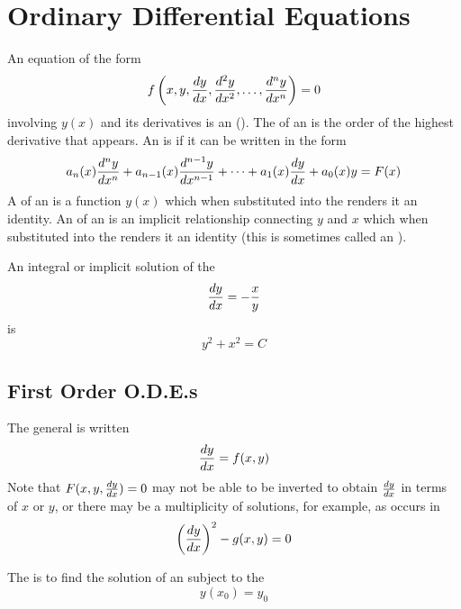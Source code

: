 %
%
%
%
%

\chapter{Ordinary Differential Equations}
\label{ode chp}

An equation of the form
$$f\left(x,y,\frac{dy}{dx},\frac{d^2y}{d{x}^2},\ldots,\frac{d^{n}y}{d{x}^{n}}\right)=0$$
involving $y(x)$ and its derivatives is an  (\ODE).  The  of an \ODE is the order of the
highest derivative that appears.  An \ODE is  if it can be
written in the form
$$a_n(x)\frac{d^{n}y}{d{x}^{n}}+a_{n-1}(x)\frac{d^{n-1}y}{d{x}^{n-1}}+\cdots+a_1(x)\frac{dy}{dx}
+a_0(x)y=F(x)$$
A  of an \ODE is a function $y(x)$ which when substituted
into the \ODE renders it an identity.  An  of an \ODE is
an implicit relationship connecting $y$ and $x$ which when substituted
into the \ODE  renders it an identity (this is sometimes called an
).

\begin{example}
An integral or implicit solution of the \ODE
$$\frac{dy}{dx}=-\frac{x}{y}$$
is
$$y^2+x^2=C$$
\end{example}

\section{First Order O.D.E.s}
\label{ode sec:foode}

The general  is written
$$\frac{dy}{dx}=f(x,y)$$
Note that $F(x,y,\frac{dy}{dx})=0$ may not be able to be inverted to obtain
$\frac{dy}{dx}$ in terms of $x$ or $y$, or there may be a multiplicity of
solutions, for example, as occurs in
$$\left(\frac{dy}{dx}\right)^2-g(x,y)=0$$

The  is to find the solution of an \ODE
subject to the 
$$y(x_0)=y_0$$

